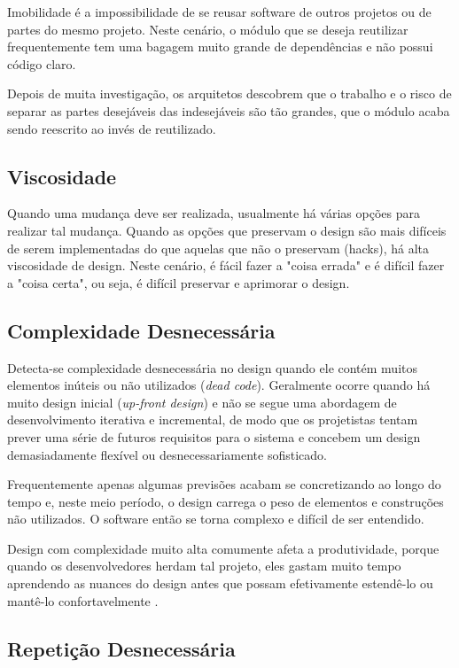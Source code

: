 Imobilidade é a impossibilidade de se reusar software de outros projetos ou de
partes do mesmo projeto. Neste cenário, o módulo que se deseja reutilizar 
frequentemente tem uma bagagem muito grande de dependências e não possui código 
claro. 

Depois de muita investigação, os arquitetos descobrem que o trabalho e o risco 
de separar as partes desejáveis das indesejáveis são tão grandes, que o módulo 
acaba sendo reescrito ao invés de reutilizado.

\subsection{Viscosidade}

Quando uma mudança deve ser realizada, usualmente há várias opções para realizar
tal mudança. Quando as opções que preservam o design são mais difíceis de serem
implementadas do que aquelas que não o preservam (hacks), há alta viscosidade 
de design. Neste cenário, é fácil fazer a "coisa errada" e é difícil fazer a
"coisa certa", ou seja, é difícil preservar e aprimorar o design.

\subsection{Complexidade Desnecessária}

Detecta-se complexidade desnecessária no design quando ele contém muitos 
elementos inúteis ou não utilizados (\textit{dead code}). Geralmente ocorre
quando há muito design inicial (\textit{up-front design}) e não se segue uma 
abordagem de desenvolvimento iterativa e incremental, de modo que os projetistas
tentam prever uma série de futuros requisitos para o sistema e concebem um 
design demasiadamente flexível ou desnecessariamente sofisticado. 

Frequentemente apenas algumas previsões acabam se concretizando ao longo do
tempo e, neste meio período, o design carrega o peso de elementos e construções 
não utilizados. O software então se torna complexo e difícil de ser entendido. 

Design com complexidade muito alta comumente afeta a produtividade, porque 
quando os desenvolvedores herdam tal projeto, eles gastam muito tempo 
aprendendo as nuances do design antes que possam efetivamente  estendê-lo ou
mantê-lo confortavelmente \cite{kerievsky}.

\subsection{Repetição Desnecessária}

